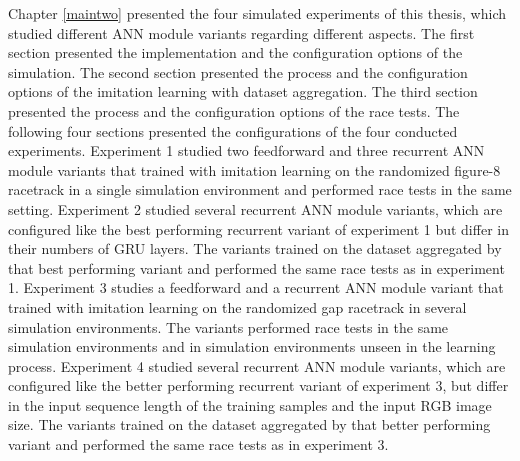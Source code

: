 Chapter \ref{maintwo} presented the four simulated experiments of this thesis, 
which studied different ANN module variants regarding different aspects. 
The first section presented the implementation and the configuration options of the simulation. 
The second section presented the process and the configuration options of the imitation learning 
with dataset aggregation. The third section presented the process and the configuration options of the race tests. 
The following four sections presented the configurations of the four conducted experiments. 
Experiment 1 studied two feedforward and three recurrent ANN module variants that trained with imitation 
learning on the randomized figure-8 racetrack in a single simulation environment and performed race tests 
in the same setting. Experiment 2 studied several recurrent ANN module variants, which are configured like 
the best performing recurrent variant of experiment 1 but differ in their numbers of GRU layers. 
The variants trained on the dataset aggregated by that best performing variant and performed the same race 
tests as in experiment 1. Experiment 3 studies a feedforward and a recurrent ANN module variant that trained 
with imitation learning on the randomized gap racetrack in several simulation environments. 
The variants performed race tests in the same simulation environments and in simulation environments unseen 
in the learning process. Experiment 4 studied several recurrent ANN module variants, which are configured 
like the better performing recurrent variant of experiment 3, but differ in the input sequence length of 
the training samples and the input RGB image size. The variants trained on the dataset aggregated by that 
better performing variant and performed the same race tests as in experiment 3.

